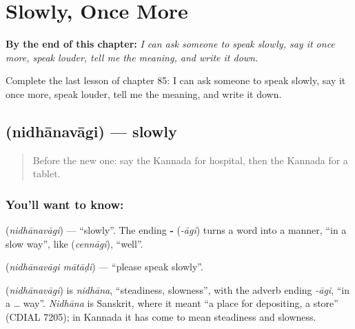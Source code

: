 
\chapter{Slowly, Once More}
\label{ch:ka-slowly-once-more}

\begin{chapteropening}
\textbf{By the end of this chapter:} \emph{I can ask someone to speak slowly, say it once more, speak louder, tell me the meaning, and write it down.}

Complete the last lesson of chapter 85: I can ask someone to speak slowly, say it once more, speak louder, tell me the meaning, and write it down.
\end{chapteropening}

\section[\texorpdfstring{\kn{ನಿಧಾನವಾಗಿ} (nidhānavāgi)}{ನಿಧಾನವಾಗಿ (nidhānavāgi)}]{ (nidhānavāgi) — slowly}

\label{lesson:KA-C85-slowly}



\begin{quote}
Before the new one: say the Kannada for hospital, then the Kannada for a tablet.
\end{quote}

\subsection*{You'll want to know: }
\textbf{} (\emph{nidhānavāgi}) — \textquotedblleft{}slowly\textquotedblright{}. The ending \textbf{‑} (\emph{-āgi}) turns a word into a manner, \textquotedblleft{}in a slow way\textquotedblright{}, like \textbf{} (\emph{cennāgi}), \textquotedblleft{}well\textquotedblright{}.

\textbf{ } (\emph{nidhānavāgi mātāḍi}) — \textquotedblleft{}please speak slowly\textquotedblright{}.

\begin{cousinweb}
\textbf{} (\emph{nidhānavāgi}) is \emph{nidhāna}, \textquotedblleft{}steadiness, slowness\textquotedblright{}, with the adverb ending \emph{-āgi}, \textquotedblleft{}in a … way\textquotedblright{}. \emph{Nidhāna} is Sanskrit, where it meant \textquotedblleft{}a place for depositing, a store\textquotedblright{} (CDIAL 7205); in Kannada it has come to mean steadiness and slowness.
\end{cousinweb}


